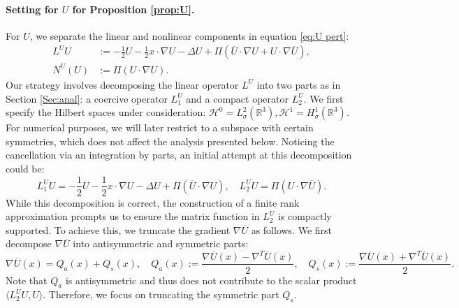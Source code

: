 \documentclass[11pt,a4paper]{article}
\numberwithin{equation}{section}
\newcommand{\assign}{:=}
\begin{document}
\paragraph{Setting for $U$ for Proposition \ref{prop:U}.}
For $U$, we separate the linear and nonlinear components in equation \eqref{eq:U
pert}:
\[\begin{aligned}
  L^U U & \assign  - \frac{1}{2} U - \frac{1}{2} x \cdot \nabla U - \Delta U
  + \Pi (\overline{U} \cdot \nabla U + U \cdot \nabla \overline{U}),\\
  N^U (U) & \assign  \Pi (U \cdot \nabla U) .
\end{aligned}\]
Our strategy involves decomposing the linear operator $L^U$ into two parts as in Section \ref{Sec:anal}: a
coercive operator $L_1^U$ and a compact operator $L_2^U$. We first specify the Hilbert spaces under consideration: $\mathcal{H}^0 =
L^2_{\sigma} (\mathbb{R}^3), \mathcal{H}^1 = H^1_{\sigma} (\mathbb{R}^3)$. For numerical purposes, we will later restrict to a subspace with certain symmetries, which does not affect the analysis presented below. Noticing the cancellation via an integration by parts, an initial attempt at this decomposition could be:
\[ L_1^U U = -\frac{1}{2} U - \frac{1}{2} x \cdot \nabla U - \Delta U + \Pi
   (\overline{U} \cdot \nabla U), \quad L_2^U U = \Pi (U \cdot \nabla
   \overline{U}) . \]
While this decomposition is correct, the construction of a finite rank approximation prompts
us to ensure the matrix function in $L_2^U$ is compactly supported. To achieve
this, we truncate the gradient $\nabla \overline{U}$ as follows. We first
decompose $\nabla \overline{U}$ into antisymmetric and symmetric parts:
\[ \nabla \overline{U} (x) = Q_a (x) + Q_s (x), \quad Q_a (x) \assign
   \frac{\nabla \overline{U} (x) - \nabla^T \overline{U} (x)}{2}, \quad Q_s
   (x) \assign \frac{\nabla \overline{U} (x) + \nabla^T \overline{U} (x)}{2} .
\]
Note that $Q_a$ is antisymmetric and thus does not contribute to the scalar
product $\langle L_2^U U, U \rangle$. Therefore, we focus on truncating the
symmetric part $Q_s$.
\end{document}
